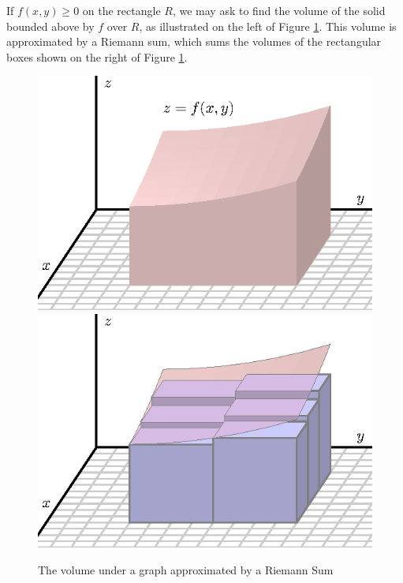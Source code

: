 If $f(x,y) \geq 0$ on the rectangle $R$, we may ask to find the volume 
of the solid bounded above by $f$ over
$R$, as illustrated on the left of Figure \ref{F:11.1.volume}.  
This volume is approximated by a
Riemann sum, which sums the volumes of the rectangular
boxes shown on the right of Figure \ref{F:11.1.volume}.  

\begin{figure}[ht]
  \begin{center}
    \includegraphics{figures/fig_11_1_volume.eps}
    \hspace*{20pt}
    \includegraphics{figures/fig_11_1_riemann_3_2.eps}
  \end{center}
  \caption{The volume under a graph approximated by a Riemann Sum}
  \label{F:11.1.volume}
\end{figure}

